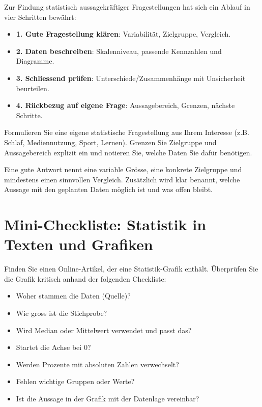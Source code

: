 \begin{myremark}
	Zur Findung statistisch aussagekräftiger Fragestellungen hat sich ein Ablauf in vier Schritten bewährt:
	\begin{itemize}
		\item \textbf{1. Gute Fragestellung klären}: Variabilität, Zielgruppe, Vergleich.
		\item \textbf{2. Daten beschreiben}: Skalenniveau, passende Kennzahlen und Diagramme.
		\item \textbf{3. Schliessend prüfen}: Unterschiede/Zusammenhänge mit Unsicherheit beurteilen.
		\item \textbf{4. Rückbezug auf eigene Frage}: Aussagebereich, Grenzen, nächste Schritte.
	\end{itemize}
\end{myremark}

\begin{myexercise}
	Formulieren Sie eine eigene statistische Fragestellung aus Ihrem Interesse (z.B. Schlaf, Mediennutzung, Sport, Lernen).
	Grenzen Sie Zielgruppe und Aussagebereich explizit ein und notieren Sie, welche Daten Sie dafür benötigen.

	\begin{myanswer}
		Eine gute Antwort nennt eine variable Grösse, eine konkrete Zielgruppe und mindestens einen sinnvollen Vergleich.
		Zusätzlich wird klar benannt, welche Aussage mit den geplanten Daten möglich ist und was offen bleibt.
	\end{myanswer}
\end{myexercise}

\section{Mini-Checkliste: Statistik in Texten und Grafiken}

\begin{myexercise}\label{myexercise:checkliste}
	Finden Sie einen Online-Artikel, der eine Statistik-Grafik enthält. Überprüfen Sie die Grafik kritisch anhand der folgenden Checkliste:
	\begin{itemize}
		\item[$\square$] Woher stammen die Daten (Quelle)?
		\item[$\square$] Wie gross ist die Stichprobe?
		\item[$\square$] Wird Median oder Mittelwert verwendet und passt das?
		\item[$\square$] Startet die Achse bei 0?
		\item[$\square$] Werden Prozente mit absoluten Zahlen verwechselt?
		\item[$\square$] Fehlen wichtige Gruppen oder Werte?
		\item[$\square$] Ist die Aussage in der Grafik mit der Datenlage vereinbar?
	\end{itemize}
\end{myexercise}

